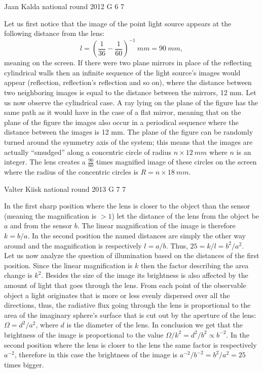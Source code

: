 \documentclass[11pt]{article}
\begin{document}
{Jaan Kalda} %
{national round} %
{2012} %
{G 6} %
{7} %
{

\ifEngSolution
Let us first notice that the image of the point light source appears at the following distance from the lens:
$$l=\left(\frac 1{36}-\frac 1{60}\right)^{-1}\SI{}{mm}=\SI{90}{mm},$$ 
meaning on the screen. If there were two plane mirrors in place of the reflecting cylindrical walls then an infinite sequence of the light source’s images would appear (reflection, reflection’s reflection and so on), where the distance between two neighboring images is equal to the distance between the mirrors, 12 mm. Let us now observe the cylindrical case. A ray lying on the plane of the figure has the same path as it would have in the case of a flat mirror, meaning that on the plane of the figure the images also occur in a periodical sequence where the distance between the images is 12 mm. The plane of the figure can be randomly turned around the symmetry axis of the system; this means that the images are actually “smudged” along a concentric circle of radius $n\times\SI{12}{mm}$ where $n$ is an integer. The lens creates a $\frac{90}{60}$ times magnified image of these circles on the screen where the radius of the concentric circles is $R=n\times \SI{18}{mm}$.
\fi
}

{Valter Kiisk} %
{national round} %
{2013} %
{G 7} %
{7} %
{

\ifEngSolution
In the first sharp position where the lens is closer to the object than the sensor (meaning the magnification is $>1$) let the distance of the lens from the object be $a$ and from the sensor $b$. The linear magnification of the image is therefore $k=b/a$. In the second position the named distances are simply the other way around and the magnification is respectively $l=a/b$. Thus, $25=k/l=b^2/a^2$.\\
Let us now analyze the question of illumination based on the distances of the first position. Since the linear magnification is $k$ then the factor describing the area change is $k^2$. Besides the size of the image its brightness is also affected by the amount of light that goes through the lens. From each point of the observable object a light originates that is more or less evenly dispersed over all the directions, thus, the radiative flux going through the lens is proportional to the area of the imaginary sphere’s surface that is cut out by the aperture of the lens: $\Omega=d^2/a^2$, where $d$ is the diameter of the lens. In conclusion we get that the brightness of the image is proportional to the value $\Omega/k^2=d^2/b^2\propto b^{-2}$. In the second position where the lens is closer to the lens the same factor is respectively $a^{-2}$, therefore in this case the brightness of the image is $a^{-2}/b^{-2}=b^2/a^2=25$ times bigger.
\fi
}
\end{document}
